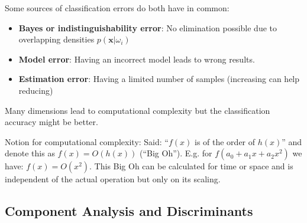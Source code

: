   Some sources of classification errors do both have in common:
  \begin{itemize}
    \item \textbf{Bayes or indistinguishability error}: No elimination possible due to overlapping
    densities $p(\bm{x}|\omega_i)$
  	\item \textbf{Model error}: Having an incorrect model leads to wrong results.
  	\item \textbf{Estimation error}: Having a limited number of samples (increasing can help reducing)
  \end{itemize}
  
  
  Many dimensions lead to computational complexity but the classification accuracy might be better.
  
  
  Notion for computational complexity: Said: ``$f(x)$ is of the order of $h(x)$'' and denote this as
  $f(x) = O(h(x))$ (``Big Oh''). E.g. for $f(a_0+a_1x+a_2x^2)$ we have: $f(x) = O(x^2)$.
  This Big Oh can be calculated for time or space and is independent of the actual operation but
  only on its scaling.
  
  \subsection{Component Analysis and Discriminants}
  
